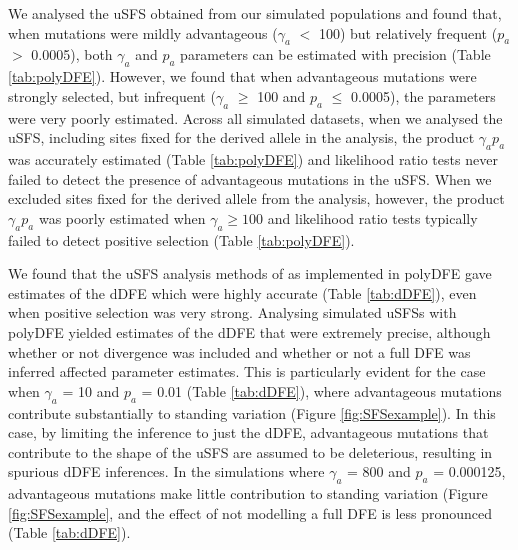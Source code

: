 {	 We analysed the uSFS obtained from our simulated populations and found that, when mutations were mildly advantageous ($\gamma_a$ $<$ 100) but relatively frequent ($p_a$ $>$ 0.0005), both $\gamma_a$ and $p_a$ parameters can be estimated with precision (Table \ref{tab:polyDFE}). However, we found that when advantageous mutations were strongly selected, but infrequent ($\gamma_a$ $\geq$ 100 and $p_a$ $\leq$ 0.0005), the parameters were very poorly estimated. Across all simulated datasets, when we analysed the uSFS, including sites fixed for the derived allele in the analysis, the product $\gamma_a p_a$ was accurately estimated (Table \ref{tab:polyDFE}) and likelihood ratio tests never failed to detect the presence of advantageous mutations in the uSFS. When we excluded sites fixed for the derived allele from the analysis, however, the product  $\gamma_a p_a$  was poorly estimated when $\gamma_a \geq 100$ and likelihood ratio tests typically failed to detect positive selection (Table \ref{tab:polyDFE}). 	 

	We found that the uSFS analysis methods of \cite{RN354} as implemented in polyDFE gave estimates of the dDFE which were highly accurate (Table \ref{tab:dDFE}), even when positive selection was very strong. Analysing simulated uSFSs with polyDFE yielded estimates of the dDFE that were extremely precise, although whether or not divergence was included and whether or not a full DFE was inferred affected parameter estimates. This is particularly evident for the case when $\gamma_a$ = 10 and $p_a$ = 0.01 (Table \ref{tab:dDFE}), where advantageous mutations contribute substantially to standing variation (Figure \ref{fig:SFSexample}). In this case, by limiting the inference to just the dDFE, advantageous mutations that contribute to the shape of the uSFS are assumed to be deleterious, resulting in spurious dDFE inferences. In the simulations where $\gamma_a$ = 800 and $p_a$ = 0.000125, advantageous mutations make little contribution to standing variation (Figure \ref{fig:SFSexample}, and the effect of not modelling a full DFE is less pronounced (Table \ref{tab:dDFE}).
	

}
